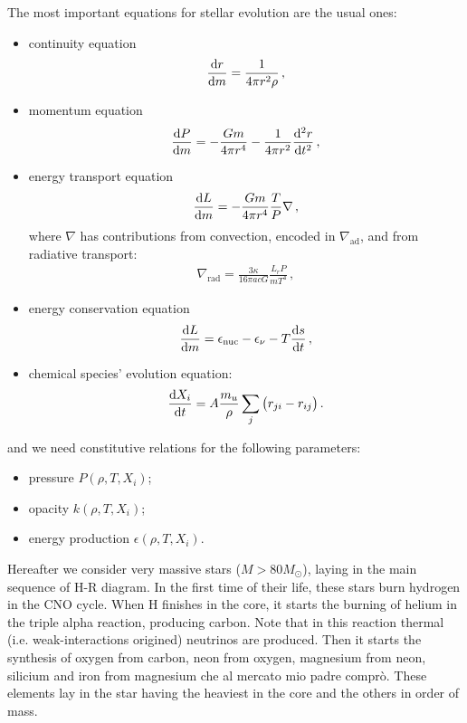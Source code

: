 \documentclass[main.tex]{subfiles}
\begin{document}
The most important equations for stellar evolution are the usual ones:
\begin{itemize}
    \item continuity equation 
    \begin{align}
    \dv{r}{m} = \frac{1}{4 \pi r^2 \rho }
    \,,
    \end{align}    
    \item momentum equation 
    \begin{align}
    \dv{P}{m} = - \frac{Gm}{4 \pi r^{4}} - \frac{1}{4 \pi r^2} \dv[2]{r}{t}
    \,,
    \end{align}
    \item energy transport equation 
    \begin{align}
    \dv{L}{m} = - \frac{Gm}{4 \pi r^4} \frac{T}{P} \nabla
    \,,
    \end{align}
    where \(\nabla\) has contributions from convection, encoded in \(\nabla _{\text{ad}} \), and from radiative transport: 
    \begin{align}
    \nabla _{\text{rad}} = \frac{3 \kappa }{16 \pi acG} \frac{L_r P}{m T^{4}}
    \,,
    \end{align}       
    \item energy conservation equation 
    \begin{align}
    \dv{L}{m} = \epsilon _{\text{nuc}}- \epsilon_{\nu } - T \dv{s}{t}
    \,,
    \end{align}
    \item chemical species' evolution equation: 
    \begin{align}
    \dv{X_{i}}{t} = A \frac{m_u}{\rho } \sum_{j} \qty(r_{ji} - r_{ij})
    \,.
    \end{align}
    
\end{itemize}
%
and we need constitutive relations for the following parameters:
%
\begin{itemize}
    \item pressure $P(\rho,T,X_i)$;
    \item opacity $k(\rho,T,X_i)$;
    \item energy production $\epsilon(\rho,T,X_i)$.
\end{itemize}

Hereafter we consider very massive stars (\(M > 80 M_{\odot}\)), laying in the main sequence of H-R diagram. In the first time of their life, these stars burn hydrogen in the CNO cycle. When H finishes in the core, it starts the burning of helium in the triple alpha reaction, producing carbon. Note that in this reaction thermal (i.e. weak-interactions origined) neutrinos are produced.
Then it starts the synthesis of oxygen from carbon, neon from oxygen, magnesium from neon, silicium and iron from magnesium che al mercato mio padre comprò. These elements lay in the star having the heaviest in the core and the others in order of mass.
\end{document}
